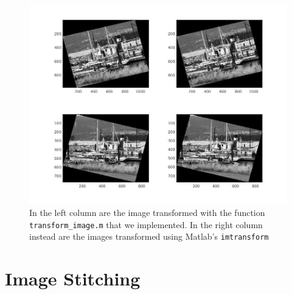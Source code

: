 \documentclass[11pt]{article}
\begin{document}
\begin{figure}[htpb]
	\centering
	\includegraphics[width=1\textwidth]{imgs/imtransform_vs_custom.jpg}
	\caption{In the left column are the image transformed with the function
		\texttt{transform\_image.m} that we implemented. In the right
		column instead are the images transformed using Matlab's
		\texttt{imtransform}}
	\label{fig:imtransform_vs_custom}
\end{figure}

\section{Image Stitching}
\end{document}
